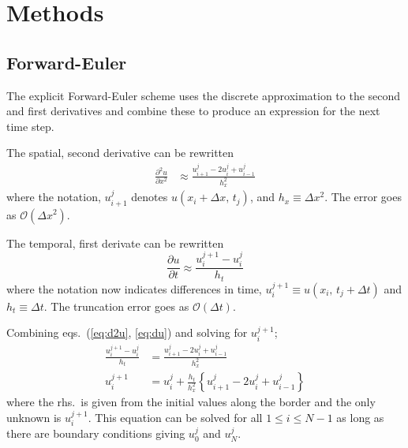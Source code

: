 \documentclass[a4paper,11pt]{article}
\begin{document}
\section{Methods}
\subsection{Forward-Euler}
The explicit Forward-Euler scheme uses the discrete approximation to the second and first derivatives and combine these to produce an expression for the next time step.

The spatial, second derivative can be rewritten
\begin{align}
    \frac{\partial^2 u}{\partial x^2} &\approx \frac{u^j_{i+1} - 2 u^j_{i} + u^j_{i-1}}{h_x^2}
    \label{eq:d2u}
\end{align}
where the notation, $u^j_{i+1}$ denotes $u(x_i + \Delta x, \, t_j)$, and $h_x \equiv \Delta x^2$. The error goes as $\mathcal{O}(\Delta x^2)$.

The temporal, first derivate can be rewritten 
\begin{equation}
    \frac{\partial u}{\partial t} \approx \frac{u^{j+1}_i - u^{j}_i}{h_t}
    \label{eq:du}
\end{equation}
where the notation now indicates differences in time, $u^{j+1}_i \equiv u\left( x_i, \, t_j + \Delta t \right)$ and $h_t \equiv \Delta t$. The truncation error goes as $\mathcal{O}(\Delta t)$.

Combining eqs.~(\ref{eq:d2u}, \ref{eq:du}) and solving for $u^{j+1}_i$;
\begin{align*}
    \frac{u^{j+1}_i - u^{j}_i}{h_t} &= \frac{u^j_{i+1} - 2 u^j_{i} + u^j_{i-1}}{h_x^2} \\
    u^{j+1}_i &= u^j_i + \frac{h_t}{h_x^2} \left\{  u^j_{i+1} - 2 u^j_{i} + u^j_{i-1} \right\} 
\end{align*}
where the rhs.~is given from the initial values along the border and the only unknown is $u^{j+1}_i$. This equation can be solved for all $ 1 \leq i \leq N-1$ as long as there are boundary conditions giving $u_0^j$ and $u_N^j$.
\end{document}
